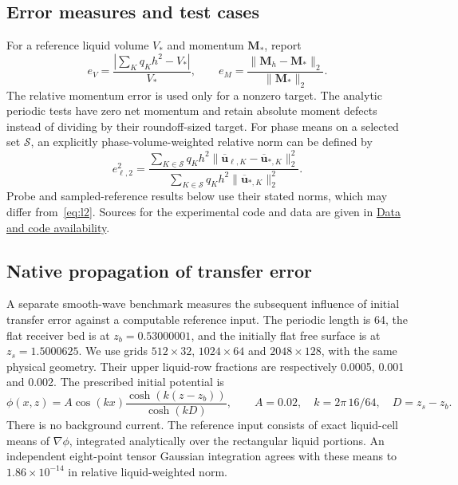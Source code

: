 \documentclass[10pt]{article}
\begin{document}
\subsection{Error measures and test cases}
For a reference liquid volume $V_*$ and momentum $\boldsymbol M_*$, report
\begin{equation}
 e_V=\frac{|\sum_Kq_Kh^2-V_*|}{V_*},\qquad
 e_M=\frac{\|\boldsymbol M_h-\boldsymbol M_*\|_2}{\|\boldsymbol M_*\|_2}.
\end{equation}
The relative momentum error is used only for a nonzero target. The analytic
periodic tests have zero net momentum and retain absolute moment defects
instead of dividing by their roundoff-sized target.
For phase means on a selected set $\mathcal S$, an explicitly
phase-volume-weighted relative norm can be defined by
\begin{equation}
 e_{\ell,2}^2=
 \frac{\sum_{K\in\mathcal S}q_Kh^2
       \|\overline{\boldsymbol u}_{\ell,K}-\overline{\boldsymbol u}_{*,K}\|_2^2}
      {\sum_{K\in\mathcal S}q_Kh^2\|\overline{\boldsymbol u}_{*,K}\|_2^2}.
 \label{eq:l2}
\end{equation}
Probe and sampled-reference results below use their stated norms, which
may differ from~\eqref{eq:l2}. Sources for the experimental code and data
are given in \hyperref[sec:data-code]{Data and code availability}.

\subsection{Native propagation of transfer error}\label{sec:native-protocol}
A separate smooth-wave benchmark measures the subsequent influence of
initial transfer error against a computable reference input. The periodic
length is 64, the flat receiver bed is at $z_b=0.53000001$, and the initially
flat free surface is at $z_s=1.5000625$. We use grids $512\times32$,
$1024\times64$ and $2048\times128$, with the same physical geometry. Their
upper liquid-row fractions are respectively 0.0005, 0.001 and 0.002. The prescribed initial potential is
\begin{equation}
 \phi(x,z)=A\cos(kx)\frac{\cosh(k(z-z_b))}{\cosh(kD)},\qquad
 A=0.02,\quad k=2\pi\,16/64,\quad D=z_s-z_b.
\end{equation}
There is no background current. The reference input consists of exact
liquid-cell means of $\nabla\phi$, integrated analytically over the rectangular
liquid portions. An independent eight-point tensor Gaussian integration
agrees with these means to $1.86\times10^{-14}$ in relative liquid-weighted norm.
\end{document}
